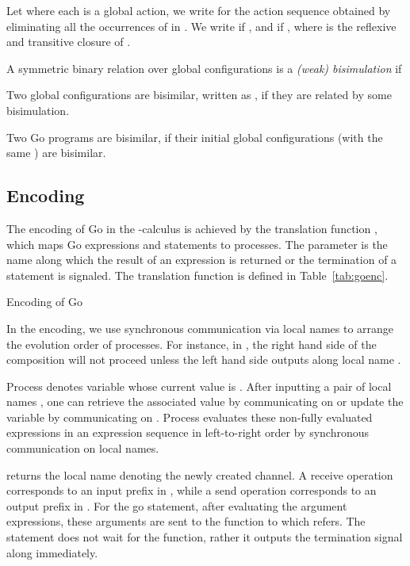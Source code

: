 \documentclass[runningheads, envcountsame, a4paper]{llncs}
\begin{document}
Let  where each  is a global action, we write  for the action sequence obtained by eliminating all the occurrences of  in . We write  if , and  if , where  is the reflexive and transitive closure of .

\begin{definition}
  A symmetric binary relation  over global configurations is a \emph{(weak) bisimulation} if
  
  Two global configurations are bisimilar, written as , if they are related by some bisimulation.
\label{def:gcwb}
\end{definition}
Two Go programs  are bisimilar, if their initial global configurations (with the same ) are bisimilar.


\subsection{Encoding}
The encoding of Go in the -calculus is achieved by the translation function ,
which maps Go expressions and statements to  processes.
The parameter  is the name along which the result of an expression is returned or the termination of a statement is signaled.
The translation function  is defined in Table~\ref{tab:goenc}.

\begin{table}

\caption{ Encoding of Go }
\label{tab:goenc}
\end{table}

In the encoding, we use synchronous communication via local names to arrange the evolution order of  processes.
For instance, in , the right hand side of the composition will not proceed
unless the left hand side outputs along local name .

Process  denotes variable  whose current value is .
After inputting a pair of local names , one can retrieve the associated value by communicating on 
or update the variable by communicating on .
Process  evaluates these non-fully evaluated expressions in an expression sequence in left-to-right order
by synchronous communication on local names.

 returns the local name denoting the newly created channel.
A receive operation corresponds to an input prefix in , while a send operation corresponds to an output prefix in .
For the go statement, after evaluating the argument expressions, these arguments are sent to the function to which  refers.
The statement does not wait for the function, rather it outputs the termination signal along  immediately.
\end{document}
